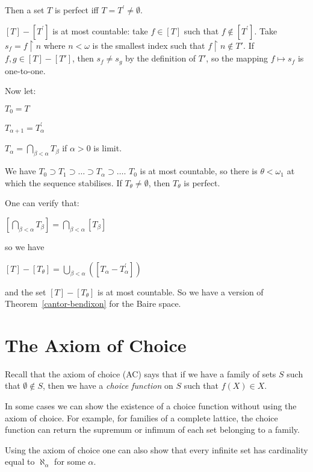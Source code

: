 \documentclass[8pt]{article}
\theoremstyle{definition}
\theoremstyle{definition}
\theoremstyle{definition}
\theoremstyle{definition}
\theoremstyle{definition}
\theoremstyle{definition}
\theoremstyle{definition}
\theoremstyle{definition}
\theoremstyle{definition}
\theoremstyle{definition}
\theoremstyle{definition}
\theoremstyle{definition}
\theoremstyle{definition}
\theoremstyle{definition}
\theoremstyle{question}
\begin{document}
Then a set $T$ is perfect iff $T = T^{'} \neq \emptyset$.

$[T] - [T^{'}]$ is at most countable: take $f \in [T]$ such that $f \notin [T^{'}]$.
Take $s_f = f \upharpoonright n$ where $n < \omega$ is the smallest index such that $f \upharpoonright n \notin T'$.
If $f, g \in [T] - [T']$, then $s_f \neq s_g$ by the definition of $T'$, so the mapping $f \mapsto s_f$ is one-to-one.

Now let:
\begin{center}
  $T_0 = T$
  
  $T_{\alpha + 1} = T^{'}_{\alpha}$

  $T_{\alpha} = \bigcap \limits_{\beta < \alpha} T_{\beta}$ if $\alpha > 0$ is limit.
\end{center}

We have $T_0 \supset T_1 \supset \dots \supset T_{\alpha} \supset \dots$. $T_0$ is at most countable, so there is
$\theta < \omega_1$ at which the sequence stabilises. If $T_{\theta} \neq \emptyset$, then $T_{\theta}$ is perfect.

One can verify that:
\begin{center}
  $[\bigcap \limits_{\beta < \alpha} T_{\beta}] = \bigcap \limits_{\beta < \alpha} [T_{\beta}]$
\end{center}
so we have
\begin{center}
  $[T] - [T_{\theta}] = \bigcup \limits_{\beta < \alpha} ([T_{\alpha} - T^{'}_{\alpha}])$
\end{center}
and the set $[T] - [T_{\theta}]$ is at most countable. So we have a version of Theorem~\ref{cantor-bendixon} for the Baire space.

\section{The Axiom of Choice}

Recall that the axiom of choice (AC) says that if we have a family of sets $S$ such that $\emptyset \notin S$, then
we have a \emph{choice function} on $S$ such that $f(X) \in X$.

In some cases we can show the existence of a choice function without using the axiom of choice. 
For example, for families of a complete lattice, the choice function can return the supremum or infimum of each set
belonging to a family.

Using the axiom of choice one can also show that every infinite set has cardinality equal to $\aleph_{\alpha}$ for some $\alpha$.
\end{document}
